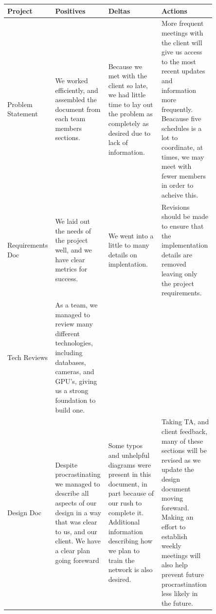 \documentclass[onecolumn, draftclsnofoot,10pt, compsoc]{IEEEtran}
\begin{document}
\begin{center}
\begin{tabular}{
|p{0.1\linewidth}
|p{0.25\linewidth}
|p{0.25\linewidth}
|p{0.25\linewidth}|
}
\hline
Project & Positives & Deltas & Actions \\\hline
Problem Statement & We worked efficiently, and assembled the document from each team members sections. & Because we met with the client so late, we had little time to lay out the problem as completely as desired due to lack of information.  & More frequent meetings with the client will give us access to the most recent updates and information more frequently. Beacause five schedules is a lot to coordinate, at times, we may meet with fewer members in order to acheive this. \\\hline
Requirements Doc & We laid out the needs of the project well, and we have clear metrics for success.  & We went into a little to many details on implentation. & Revisions should be made to ensure that the implementation details are removed leaving only the project requirements.  \\\hline
Tech Reviews  & As a team, we managed to review many different technologies, including databases, cameras, and GPU's, giving us a strong foundation to build one. &  &  \\\hline
Design Doc & Despite procrastinating we managed to describe all aspects of our design in a way that was clear to us, and our client. We have a clear plan going foreward & Some typos and unhelpful diagrams were present in this document, in part because of our rush to complete it. Additional information describing how we plan to train the network is also desired. & Taking TA, and client feedback, many of these sections will be revised as we update the design document moving foreward. Making an effort to establish weekly meetings will also help prevent future procrastination less likely in the future. \\\hline
\end{tabular}

\end{center}
\end{document}
